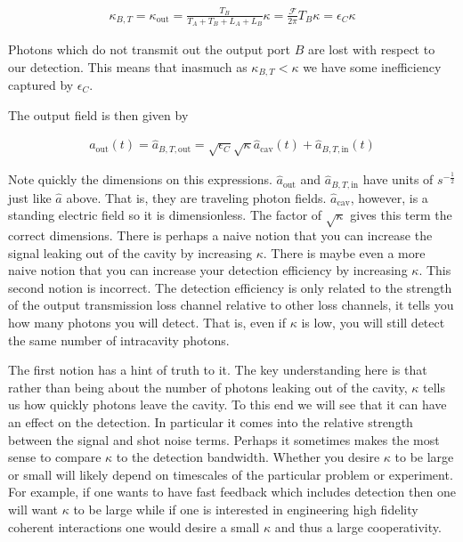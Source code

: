 \documentclass[12pt]{article}
\newcommand{\ep}{\epsilon}
\begin{document}
\begin{align}
\kappa_{B, T} = \kappa_{\text{out}} = \frac{T_B}{T_A+T_B+L_A+L_B}\kappa = \frac{\mathcal{F}}{2\pi}T_B \kappa = \ep_C\kappa
\end{align}

Photons which do not transmit out the output port $B$ are lost with respect to our detection. This means that inasmuch as $\kappa_{B,T} < \kappa$ we have some inefficiency captured by $\ep_C$. 

The output field is then given by

\begin{align}
a_{\text{out}}(t) = \hat{a}_{B,T,\text{out}} =\sqrt{\ep_C}\sqrt{\kappa} \hat{a}_{\text{cav}}(t) + \hat{a}_{B,T,\text{in}}(t)
\end{align}

Note quickly the dimensions on this expressions. $\hat{a}_{\text{out}}$ and $\hat{a}_{B,T,\text{in}}$ have units of $s^{-\frac{1}{2}}$ just like $\hat{a}$ above. That is, they are traveling photon fields. $\hat{a}_{\text{cav}}$, however, is a standing electric field so it is dimensionless. The factor of $\sqrt{\kappa}$ gives this term the correct dimensions. 
There is perhaps a naive notion that you can increase the signal leaking out of the cavity by increasing $\kappa$. There is maybe even a more naive notion that you can increase your detection efficiency by increasing $\kappa$. This second notion is incorrect. The detection efficiency is only related to the strength of the output transmission loss channel relative to other loss channels, it tells you how many photons you will detect. That is, even if $\kappa$ is low, you will still detect the same number of intracavity photons. 

The first notion has a hint of truth to it. The key understanding here is that rather than being about the number of photons leaking out of the cavity, $\kappa$ tells us how quickly photons leave the cavity. To this end we will see that it can have an effect on the detection. In particular it comes into the relative strength between the signal and shot noise terms. Perhaps it sometimes makes the most sense to compare $\kappa$ to the detection bandwidth. Whether you desire $\kappa$ to be large or small will likely depend on timescales of the particular problem or experiment. For example, if one wants to have fast feedback which includes detection then one will want $\kappa$ to be large while if one is interested in engineering high fidelity coherent interactions one would desire a small $\kappa$ and thus a large cooperativity.
\end{document}
